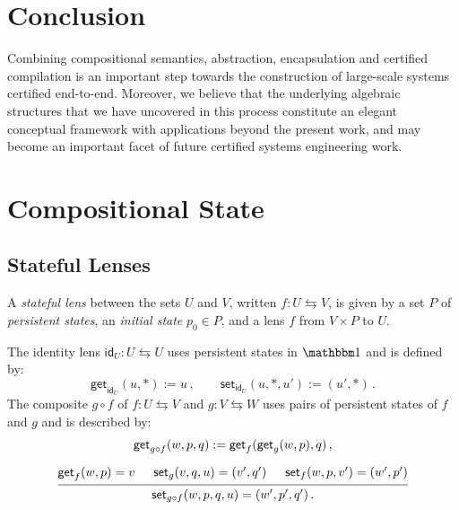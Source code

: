 \documentclass[acmsmall,screen,review,nonacm]{acmart}
\newcommand{\kw}[1]{\ensuremath{ \mathsf{#1} }}
\begin{document}

\section{Conclusion} \label{sec:conclusion} %

Combining compositional semantics,
abstraction,
encapsulation and certified compilation
is an important step towards
the construction of large-scale systems certified end-to-end.
Moreover,
we believe that
the underlying algebraic structures that we have uncovered
in this process
constitute an elegant conceptual framework
with applications beyond the present work,
and may become an important facet of
future certified systems engineering work.




\ifdefined\withappendix

\appendix

\newpage

\section{Compositional State} %

\subsection{Stateful Lenses}

\begin{definition}
A \emph{stateful lens} between the sets $U$ and $V$,
written $f : U \leftrightarrows V$,
is given by a set $P$ of \emph{persistent states},
an \emph{initial state} $p_0 \in P$,
and a lens $f$ from $V \times P$ to $U$.

The identity lens $\kw{id}_U : U \leftrightarrows U$
uses persistent states in $\mathbbm1$ and is defined by:
\[
  \kw{get}_{\kw{id}_U}(u, *) := u
  \,,
  \qquad
  \kw{set}_{\kw{id}_U}(u, *, u') := (u', *)
  \,.
\]
The composite $g \circ f$ of
$f : U \leftrightarrows V$ and
$g : V \leftrightarrows W$
uses pairs of persistent states of $f$ and $g$ and
is described by:
\begin{gather*}
  \kw{get}_{g \circ f}(w, p, q) := \kw{get}_f(\kw{get}_g(w, p), q)
  \,,
  \\[1.5ex]
  \begin{prooftree}
    \hypo{\kw{get}_f(w, p) = v}
    \hypo{\kw{set}_g(v, q, u) = (v', q')}
    \hypo{\kw{set}_f(w, p, v') = (w', p')}
    \infer3{\kw{set}_{g \circ f}(w, p, q, u) = (w', p', q') \,.}
  \end{prooftree}
\end{gather*}
\end{definition}
\end{document}
